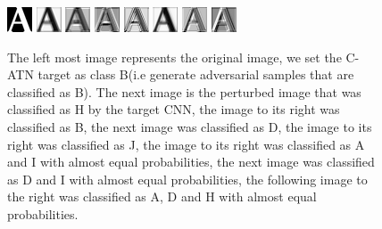 \documentclass[12pt, conference, letterpaper]{IEEEtran}
\begin{document}
{{{{{{{{{{{{{{\begin{figure}[h]
\includegraphics[scale=1.0]{pictures/first_original.png}
\includegraphics[scale=1.0]{pictures/A_class_as_H(2).png}
\includegraphics[scale=1.0]{pictures/A_class_as_B.png}
\includegraphics[scale=1.0]{pictures/A_class_as_D.png}
\includegraphics[scale=1.0]{pictures/A_class_as_J.png}
\includegraphics[scale=1.0]{pictures/A_class_A_and_I.png}
\includegraphics[scale=1.0]{pictures/A_class_as_D_and_I.png}
\includegraphics[scale=1.0]{pictures/A_class_as_A_D_H.png}




\caption{The left most image represents the original image, we set the C-ATN target as class B(i.e generate adversarial samples that are classified as B). The next image is the perturbed image that was classified as H by the target CNN, the image to its right was classified as B, the next image was classified as D, the image to its right was classified as J, the image to its right was classified as A and I with almost equal probabilities, the next image was classified as D and I with almost equal probabilities, the following image to the right was classified as A, D and H with almost equal probabilities.}
\end{figure} 
}}}}}}}}}}}}}}
\end{document}
